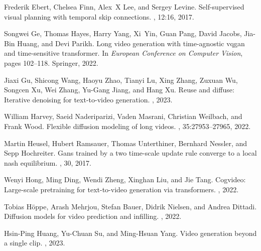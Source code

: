\documentclass{article}
\begin{document}
\begin{thebibliography}{}
Frederik Ebert, Chelsea Finn, Alex~X Lee, and Sergey Levine.
\newblock Self-supervised visual planning with temporal skip connections.
, 12:16, 2017.

Songwei Ge, Thomas Hayes, Harry Yang, Xi~Yin, Guan Pang, David Jacobs, Jia-Bin Huang, and Devi Parikh.
\newblock Long video generation with time-agnostic vqgan and time-sensitive transformer.
\newblock In {\em European Conference on Computer Vision}, pages 102--118. Springer, 2022.

Jiaxi Gu, Shicong Wang, Haoyu Zhao, Tianyi Lu, Xing Zhang, Zuxuan Wu, Songcen Xu, Wei Zhang, Yu-Gang Jiang, and Hang Xu.
\newblock Reuse and diffuse: Iterative denoising for text-to-video generation.
, 2023.

William Harvey, Saeid Naderiparizi, Vaden Masrani, Christian Weilbach, and Frank Wood.
\newblock Flexible diffusion modeling of long videos.
, 35:27953--27965, 2022.

Martin Heusel, Hubert Ramsauer, Thomas Unterthiner, Bernhard Nessler, and Sepp Hochreiter.
\newblock Gans trained by a two time-scale update rule converge to a local nash equilibrium.
, 30, 2017.

Wenyi Hong, Ming Ding, Wendi Zheng, Xinghan Liu, and Jie Tang.
\newblock Cogvideo: Large-scale pretraining for text-to-video generation via transformers.
, 2022.

Tobias H{\"o}ppe, Arash Mehrjou, Stefan Bauer, Didrik Nielsen, and Andrea Dittadi.
\newblock Diffusion models for video prediction and infilling.
, 2022.

Hsin-Ping Huang, Yu-Chuan Su, and Ming-Hsuan Yang.
\newblock Video generation beyond a single clip.
, 2023.


\end{thebibliography}
\end{document}
